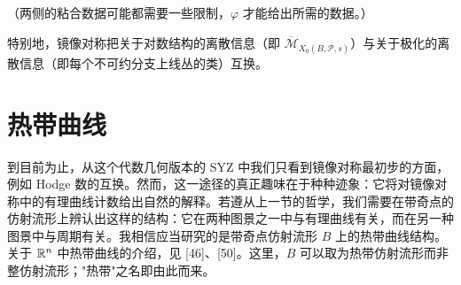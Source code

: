 \begin{center}
\renewcommand{\arraystretch}{1.3}
\end{center}

（两侧的粘合数据可能都需要一些限制，$\varphi$ 才能给出所需的数据。）

特别地，镜像对称把关于对数结构的离散信息（即 $\overline{\mathcal M}_{X_0(B,\mathcal P,s)}$）与关于极化的离散信息（即每个不可约分支上线丛的类）互换。

\section{热带曲线}

到目前为止，从这个代数几何版本的 SYZ 中我们只看到镜像对称最初步的方面，例如 Hodge 数的互换。然而，这一途径的真正趣味在于种种迹象：它将对镜像对称中的有理曲线计数给出自然的解释。若遵从上一节的哲学，我们需要在带奇点的仿射流形上辨认出这样的结构：它在两种图景之一中与有理曲线有关，而在另一种图景中与周期有关。我相信应当研究的是带奇点仿射流形 $B$ 上的热带曲线结构。关于 $\mathbb{R}^n$ 中热带曲线的介绍，见 [46]、[50]。这里，$B$ 可以取为热带仿射流形而非整仿射流形；"热带"之名即由此而来。
